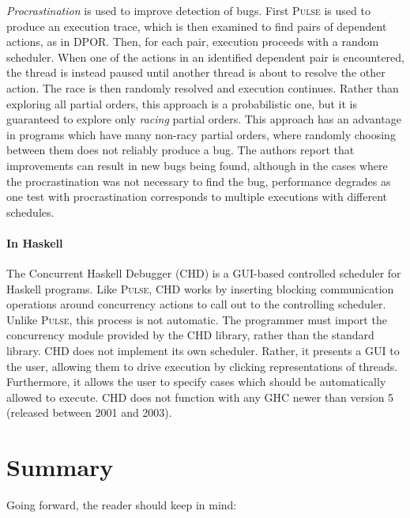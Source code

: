 \emph{Procrastination} \parencite{sen2008} is used to improve detection of
bugs.  First \textsc{Pulse} is used to produce an execution trace,
which is then examined to find pairs of dependent actions, as in DPOR.
Then, for each pair, execution proceeds with a random scheduler.  When
one of the actions in an identified dependent pair is encountered, the
thread is instead paused until another thread is about to resolve the
other action.  The race is then randomly resolved and execution
continues.  Rather than exploring all partial orders, this approach is
a probabilistic one, but it is guaranteed to explore only
\emph{racing} partial orders.  This approach has an advantage in
programs which have many non-racy partial orders, where randomly
choosing between them does not reliably produce a bug.  The authors
report that improvements can result in new bugs being found, although
in the cases where the procrastination was not necessary to find the
bug, performance degrades \parencite{arts2011} as one test with
procrastination corresponds to multiple executions with different
schedules.

\paragraph{In Haskell}
The Concurrent Haskell Debugger (CHD) \parencite{bottcher2002} is a
GUI-based controlled scheduler for Haskell programs.  Like
\textsc{Pulse}, CHD works by inserting blocking communication
operations around concurrency actions to call out to the controlling
scheduler.  Unlike \textsc{Pulse}, this process is not automatic.  The
programmer must import the concurrency module provided by the CHD
library, rather than the standard library.  CHD does not implement its
own scheduler.  Rather, it presents a GUI to the user, allowing them
to drive execution by clicking representations of threads.
Furthermore, it allows the user to specify cases which should be
automatically allowed to execute.  CHD does not function with any GHC
newer than version 5 (released between 2001 and 2003).

\section{Summary}

Going forward, the reader should keep in mind:

